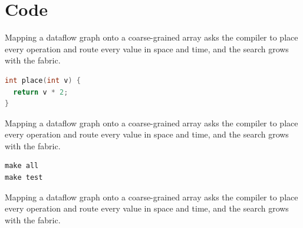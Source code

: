 \documentclass{article}
\begin{document}
\section{Code}
Mapping a dataflow graph onto a coarse-grained array asks the compiler to place every operation and route every value in space and time, and the search grows with the fabric.
\begin{algorithm}[h]
\caption{Map}\label{alg:m}
\;
\end{algorithm}
\begin{lstlisting}[language=C]
int place(int v) {
  return v * 2;
}
\end{lstlisting}
Mapping a dataflow graph onto a coarse-grained array asks the compiler to place every operation and route every value in space and time, and the search grows with the fabric.
\begin{verbatim}
make all
make test
\end{verbatim}
Mapping a dataflow graph onto a coarse-grained array asks the compiler to place every operation and route every value in space and time, and the search grows with the fabric.
\end{document}
